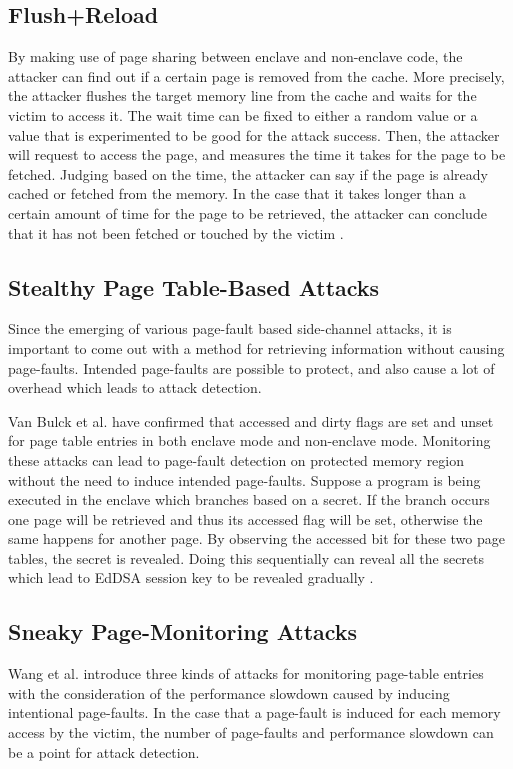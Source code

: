 \subsection{Flush+Reload}
By making use of page sharing between enclave and non-enclave code, the attacker can find out if a certain page is removed from the cache. More precisely, the attacker flushes the target memory line from the cache and waits for the victim to access it. The wait time can be fixed to either a random value or a value that is experimented to be good for the attack success. Then, the attacker will request to access the page, and measures the time it takes for the page to be fetched. Judging based on the time, the attacker can say if the page is already cached or fetched from the memory. In the case that it takes longer than a certain amount of time for the page to be retrieved, the attacker can conclude that it has not been fetched or touched by the victim \cite{flushreload}.

\subsection{Stealthy Page Table-Based Attacks}
Since the emerging of various page-fault based side-channel attacks, it is important to come out with a method for retrieving information without causing page-faults. Intended page-faults are possible to protect, and also cause a lot of overhead which leads to attack detection.

Van Bulck et al. \cite{stealthy} have confirmed that accessed and dirty flags are set and unset for page table entries in both enclave mode and non-enclave mode. Monitoring these attacks can lead to page-fault detection on protected memory region without the need to induce intended page-faults. Suppose a program is being executed in the enclave which branches based on a secret. If the branch occurs one page will be retrieved and thus its accessed flag will be set, otherwise the same happens for another page. By observing the accessed bit for these two page tables, the secret is revealed. Doing this sequentially can reveal all the secrets which lead to EdDSA session key to be revealed gradually \cite{stealthy}.


\subsection{Sneaky Page-Monitoring Attacks}
Wang et al. \cite{leakycauldron} introduce three kinds of attacks for monitoring page-table entries with the consideration of the performance slowdown caused by inducing intentional page-faults. In the case that a page-fault is induced for each memory access by the victim, the number of page-faults and performance slowdown can be a point for attack detection.
